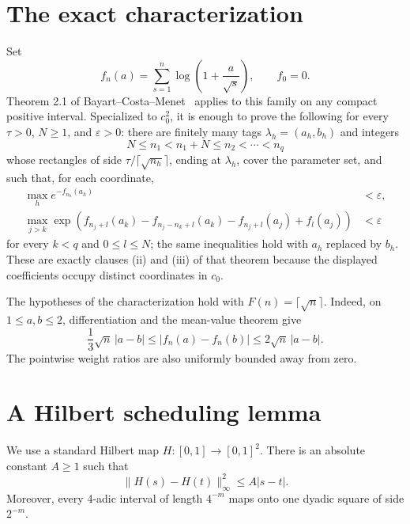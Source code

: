 \documentclass[11pt]{article}
\begin{document}
\section*{The exact characterization}

Set
\[
 f_n(a)=\sum_{s=1}^n\log\left(1+\frac a{\sqrt s}\right),\qquad f_0=0.
\]
Theorem 2.1 of Bayart--Costa--Menet~\cite{BayartCostaMenet} applies to this
family on any compact positive interval.  Specialized to \(c_0^2\), it is
enough to prove the following for every \(\tau>0\), \(N\geq1\), and
\(\varepsilon>0\): there are finitely many tags
\(\lambda_h=(a_h,b_h)\) and integers
\[
 N\leq n_1<n_1+N\leq n_2<\cdots<n_q
\]
whose rectangles of side \(\tau/\lceil\sqrt{n_h}\rceil\), ending at
\(\lambda_h\), cover the parameter set, and such that, for each coordinate,
\begin{align}
 \max_h e^{-f_{n_h}(a_h)}&<\varepsilon,
 \label{eq:direct}\\
 \max_{j>k}
 \exp\!\left(
 f_{n_j+l}(a_k)-f_{n_j-n_k+l}(a_k)
 -f_{n_j+l}(a_j)+f_l(a_j)
 \right)&<\varepsilon
 \label{eq:cross}
\end{align}
for every \(k<q\) and \(0\leq l\leq N\); the same inequalities hold with
\(a_h\) replaced by \(b_h\).  These are exactly clauses (ii) and (iii) of
that theorem because the displayed coefficients occupy distinct coordinates
in \(c_0\).

The hypotheses of the characterization hold with
\(F(n)=\lceil\sqrt n\rceil\).  Indeed, on \(1\leq a,b\leq2\), differentiation
and the mean-value theorem give
\begin{equation}
 \frac13\sqrt n\,|a-b|
 \leq |f_n(a)-f_n(b)|
 \leq2\sqrt n\,|a-b|.
 \label{eq:lipschitz}
\end{equation}
The pointwise weight ratios are also uniformly bounded away from zero.

\section*{A Hilbert scheduling lemma}

We use a standard Hilbert map \(H:[0,1]\to[0,1]^2\).  There is an absolute
constant \(A\geq1\) such that
\begin{equation}
 \|H(s)-H(t)\|_\infty^2\leq A|s-t|.
 \label{eq:hilbert-holder}
\end{equation}
Moreover, every 4-adic interval of length \(4^{-m}\) maps onto one dyadic
square of side \(2^{-m}\).
\end{document}
